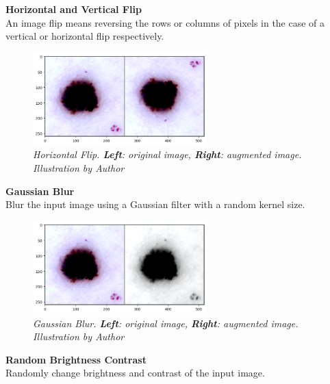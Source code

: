 \newpage

\textbf{Horizontal and Vertical Flip} \\

An image flip means reversing the rows or columns of pixels in the case of a vertical or horizontal flip respectively.

\begin{figure}[H]
  \centering
  \includegraphics[width=0.6\textwidth]{imatges/methodological_contribution/horizontal-flip.png}
  \caption[Horizontal Flip]{\textit{Horizontal Flip. \textbf{Left}: original image, \textbf{Right}: augmented image. Illustration by Author}}
\end{figure}

\vspace{0.5cm}
\textbf{Gaussian Blur} \\

Blur the input image using a Gaussian filter with a random kernel size.

\begin{figure}[H]
  \centering
  \includegraphics[width=0.6\textwidth]{imatges/methodological_contribution/gaussianblur.png}
  \caption[Gaussian Blur]{\textit{Gaussian Blur. \textbf{Left}: original image, \textbf{Right}: augmented image. Illustration by Author}}
\end{figure}

\newpage

\textbf{Random Brightness Contrast} \\

Randomly change brightness and contrast of the input image.

